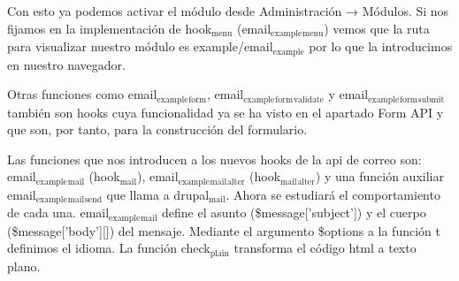 \documentclass[11pt]{article}
\begin{document}
Con esto ya podemos activar el módulo desde Administración →
Módulos. Si nos fijamos en la implementación de hook$_{\mathrm{menu}}$
(email$_{\mathrm{example}}$$_{\mathrm{menu}}$) vemos que la ruta para visualizar nuestro módulo
es example/email$_{\mathrm{example}}$ por lo que la introducimos en nuestro
navegador.

Otras funciones como email$_{\mathrm{example}}$$_{\mathrm{form}}$, email$_{\mathrm{example}}$$_{\mathrm{form}}$$_{\mathrm{validate}}$ y
email$_{\mathrm{example}}$$_{\mathrm{form}}$$_{\mathrm{submit}}$ también son hooks cuya funcionalidad ya se
ha visto en el apartado Form API y que son, por tanto, para la
construcción del formulario.

Las funciones que nos introducen a los nuevos hooks de la api de
correo son: email$_{\mathrm{example}}$$_{\mathrm{mail}}$ (hook$_{\mathrm{mail}}$), email$_{\mathrm{example}}$$_{\mathrm{mail}}$$_{\mathrm{alter}}$
(hook$_{\mathrm{mail}}$$_{\mathrm{alter}}$) y una función auxiliar email$_{\mathrm{example}}$$_{\mathrm{mail}}$$_{\mathrm{send}}$ que
llama a drupal$_{\mathrm{mail}}$. Ahora se estudiará el comportamiento de cada una.
email$_{\mathrm{example}}$$_{\mathrm{mail}}$ define el asunto (\$message['subject']) y el cuerpo
(\$message['body'][]) del mensaje. Mediante el argumento \$options a la
función t definimos el idioma. La función check$_{\mathrm{plain}}$ transforma el
código html a texto plano.  
\end{document}
